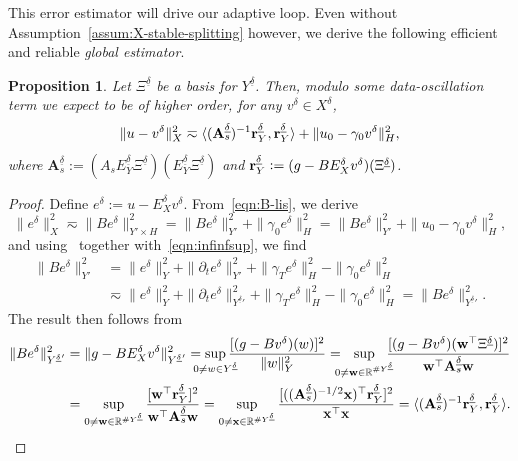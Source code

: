 \documentclass[11pt,a4paper,oneside,english]{amsart}
\numberwithin{equation}{section}
\numberwithin{theorem}{section}
\newtheorem{prop}[theorem]{Proposition}
\theoremstyle{definition}
\newcommand{\R}{\mathbb{R}}
\newcommand{\la}{\langle}
\newcommand{\ra}{\rangle}
\newcommand{\udelta}{{\underline{\delta}}}
\newcommand{\jw}[1]{{\color{red}{JW: #1}}}
\begin{document}
This error estimator will drive our adaptive loop. Even without Assumption~\ref{assum:X-stable-splitting} however, we derive the following efficient and reliable \emph{global estimator}.
\begin{prop}
  \label{prop:global-apost}
  Let $\Xi^{\udelta}$ be a basis for $Y^{\udelta}$. Then, modulo some data-oscillation
  term we expect to be of higher order, for any $v^\delta \in X^\delta$,
  \[
    \|u - v^\delta\|_X^2 \eqsim \la (\mathbf A_s^{\udelta})^{-1}{\bf r}^\udelta_Y, {\bf r}^\udelta_Y \ra + \|u_0 - \gamma_0 v^\delta\|_H^2,
  \] 
  where $\mathbf A_s^{\udelta} := (A_s E_Y^{\udelta} \Xi^{\udelta})(E_Y^{\udelta} \Xi^{\udelta})$ and ${\bf r}^\udelta_Y := (g - B E_X^{\delta} v^\delta)(\Xi^\udelta)$.
  \jw{zouden we in staat zijn om de constantes hidden in $\eqsim$ hierboven, precies te maken? Mss de data oscillation erin?}
\end{prop}
\begin{proof}
  Define $e^\delta := u - E_X^\delta v^\delta$. From~\eqref{eqn:B-lis}, we derive
  \[
    \|e^\delta\|_X^2 \eqsim \|B e^\delta\|_{Y' \times H}^2
    = \|B e^\delta\|_{Y'}^2 + \|\gamma_0 e^\delta\|_H^2 = \|B e^\delta\|_{Y'}^2 + \|u_0 - \gamma_0 v^\delta\|_H^2,
  \]
  and using~\cite[Lemma 3.4]{Stevenson2020a} together with~\eqref{eqn:infinfsup}, we find
  \begin{align*}
    \|B e^\delta\|_{Y'}^2 &= \|e^\delta\|_Y^2 + \|\partial_t e^\delta\|_{Y'}^2 + \|\gamma_T e^\delta\|_H^2 - \|\gamma_0 e^\delta\|_H^2 \\
    &\eqsim \|e^\delta\|_Y^2 + \|\partial_t e^\delta\|_{{Y^\udelta}'}^2 + \|\gamma_T e^\delta\|_H^2 - \|\gamma_0 e^\delta\|_H^2 = \|B e^\delta\|_{{Y^\udelta}'}^2.
  \end{align*}
  The result then follows from
  \begin{align*}
    \|B e^\delta\|_{{Y^\udelta}'}^2 &= \|g - BE_X^\delta v^\delta\|_{{Y^\udelta}'}^2
    = \sup_{\mathclap{0 \not= w \in Y^\udelta}} \frac{[(g - Bv^\delta)(w)]^2}{\|w\|_Y^2} = ~~\sup_{\mathclap{0 \not= {\bf w} \in \R^{\# Y^\udelta}}} ~~\frac{[(g - Bv^\delta)({\bf w}^\top \Xi^\udelta)]^2}{{\bf w}^\top {\bf A}_s^\udelta {\bf w}} \\
    &= \sup_{0 \not= {\bf w} \in \R^{\# Y^\udelta}} \frac{[{\bf w}^\top {\bf r}^\udelta_Y]^2}{{\bf w}^\top {\bf A}_s^\udelta {\bf w}} = \sup_{0 \not= {\bf x} \in \R^{\# Y^\udelta}} \frac{[(({\bf A}_s^\udelta)^{-1/2}{\bf x})^\top {\bf r}^\udelta_Y]^2}{{\bf x}^\top {\bf x}} = \la ({\bf A}_s^\udelta)^{-1} {\bf r}_Y^\udelta, {\bf r}_Y^\udelta \ra. \qedhere
  \end{align*}
\end{proof}
\end{document}
